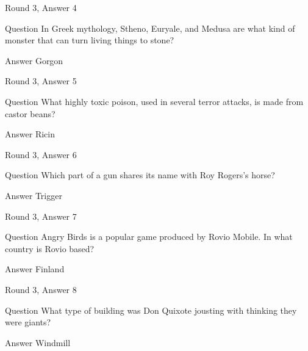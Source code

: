 \documentclass[11pt]{beamer}
\begin{document}
\begin{frame}[t]{Round 3, Answer 4}
\vspace{2em}
\begin{block}{Question}
In Greek mythology, Stheno, Euryale, and Medusa are what kind of monster that can turn living things to stone\@?
\end{block}
\pause{}
\begin{block}{Answer}
Gorgon
\end{block}
\end{frame}
    

\begin{frame}[t]{Round 3, Answer 5}
\vspace{2em}
\begin{block}{Question}
What highly toxic poison, used in several terror attacks, is made from castor beans\@?
\end{block}
\pause{}
\begin{block}{Answer}
Ricin
\end{block}
\end{frame}
    

\begin{frame}[t]{Round 3, Answer 6}
\vspace{2em}
\begin{block}{Question}
Which part of a gun shares its name with Roy Rogers's horse\@?
\end{block}
\pause{}
\begin{block}{Answer}
Trigger
\end{block}
\end{frame}
    

\begin{frame}[t]{Round 3, Answer 7}
\vspace{2em}
\begin{block}{Question}
Angry Birds is a popular game produced by Rovio Mobile. In what country is Rovio based\@?
\end{block}
\pause{}
\begin{block}{Answer}
Finland
\end{block}
\end{frame}
    

\begin{frame}[t]{Round 3, Answer 8}
\vspace{2em}
\begin{block}{Question}
What type of building was Don Quixote jousting with thinking they were giants\@?
\end{block}
\pause{}
\begin{block}{Answer}
Windmill
\end{block}
\end{frame}
    
\end{document}
